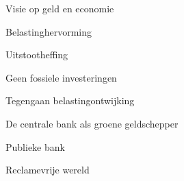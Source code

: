 
\begin{voorstel}{Visie op geld en economie}\end{voorstel}

\begin{voorstel}{Belastinghervorming}\end{voorstel}
\begin{voorstel}{Uitstootheffing}\end{voorstel}
\begin{voorstel}{Geen fossiele investeringen}\end{voorstel}
\begin{voorstel}{Tegengaan belastingontwijking}\end{voorstel}
\begin{voorstel}{De centrale bank als groene geldschepper}\end{voorstel}
\begin{voorstel}{Publieke bank}\end{voorstel}
\begin{voorstel}{Reclamevrije wereld}\end{voorstel}
